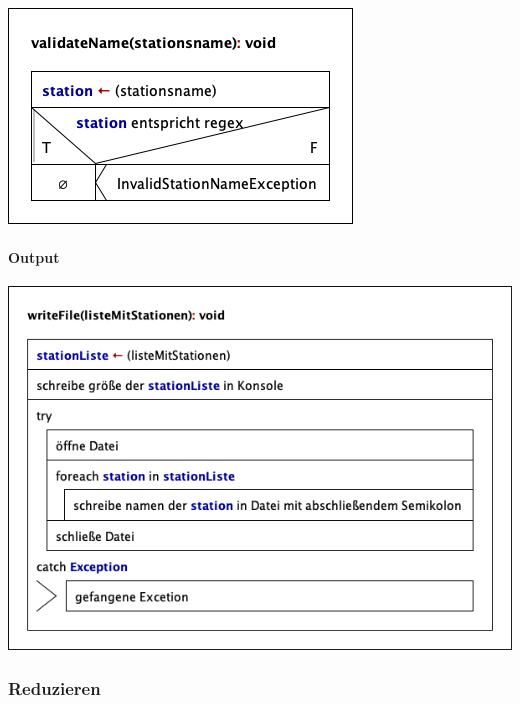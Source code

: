 \begin{center}
    \includegraphics[width=\linewidth]{images/Struktogramme/io/validateName.png}
    \label{pro:subsubsecpar:namen-validator}
\end{center}


\paragraph{Output}\label{pro:subsubsecpar:output}
\begin{center}
    \includegraphics[width=\linewidth]{images/Struktogramme/io/writeFile.png}
    \label{pro:subsubsecpar:namen-validator}
\end{center}


\subsubsection{Reduzieren}\label{pro:subsubsec:reduzieren}

